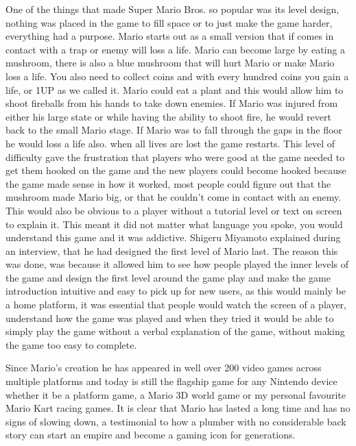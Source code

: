 \documentclass{article}
\begin{document}
One of the things that made Super Mario Bros. so popular was its level design, nothing was placed in the game to fill space or to just make the game harder, everything had a purpose. Mario starts out as a small version that if comes in contact with a trap or enemy will loss a life. Mario can become large by eating a mushroom, there is also a blue mushroom that will hurt Mario or make Mario loss a life. You also need to collect coins and with every hundred coins you gain a life, or 1UP as we called it.  Mario could eat a plant and this would allow him to shoot fireballs from his hands to take down enemies. If Mario was injured from either his large state or while having the ability to shoot fire, he would revert back to the small Mario stage. If Mario was to fall through the gaps in the floor he would loss a life also. when all lives are lost the game restarts. This level of difficulty gave the frustration that players who were good at the game needed to get them hooked on the game and the new players could become hooked because the game made sense in how it worked, most people could figure out that the mushroom made   Mario big, or that he couldn't come in contact with an enemy. This would also be obvious to a player without a tutorial level or text on screen to explain it. This meant it did not matter what language you spoke, you would understand this game and it was addictive. \newline 
Shigeru Miyamoto explained during an interview, that he had designed the first level of Mario last. The reason this was done, was because it allowed him to see how people played the inner levels of the game and design the first level around the game play and make the game introduction intuitive and easy to pick up for new users, as this would mainly be a home platform, it was essential that people would watch the screen of a player, understand how the game was played and when they tried it would be able to simply play the game without a verbal explanation of the game, without making the game too easy to complete.  \newline 

Since Mario's creation he has appeared in well over 200 video games across multiple platforms and today is still the flagship game for any Nintendo device whether it be a platform game, a Mario 3D world game or my personal favourite Mario Kart racing games. It is clear that Mario has lasted a long time and has no signs of slowing down, a testimonial to how a plumber with no considerable back story can start an empire and become a gaming icon for generations.
\clearpage		
\end{document}
